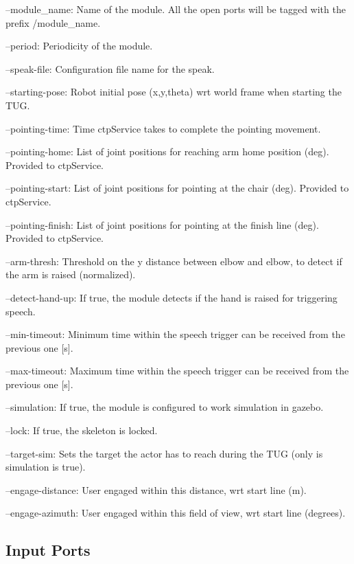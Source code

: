 \begin{DoxyItemize}
\item --module\+\_\+name\+: Name of the module. All the open ports will be tagged with the prefix /module\+\_\+name.
\item --period\+: Periodicity of the module.
\item --speak-\/file\+: Configuration file name for the speak.
\item --starting-\/pose\+: Robot initial pose (x,y,theta) wrt world frame when starting the T\+UG.
\item --pointing-\/time\+: Time ctp\+Service takes to complete the pointing movement.
\item --pointing-\/home\+: List of joint positions for reaching arm home position (deg). Provided to ctp\+Service.
\item --pointing-\/start\+: List of joint positions for pointing at the chair (deg). Provided to ctp\+Service.
\item --pointing-\/finish\+: List of joint positions for pointing at the finish line (deg). Provided to ctp\+Service.
\item --arm-\/thresh\+: Threshold on the y distance between elbow and elbow, to detect if the arm is raised (normalized).
\item --detect-\/hand-\/up\+: If true, the module detects if the hand is raised for triggering speech.
\item --min-\/timeout\+: Minimum time within the speech trigger can be received from the previous one \mbox{[}s\mbox{]}.
\item --max-\/timeout\+: Maximum time within the speech trigger can be received from the previous one \mbox{[}s\mbox{]}.
\item --simulation\+: If true, the module is configured to work simulation in gazebo.
\item --lock\+: If true, the skeleton is locked.
\item --target-\/sim\+: Sets the target the actor has to reach during the T\+UG (only is simulation is true).
\item --engage-\/distance\+: User engaged within this distance, wrt start line (m).
\item --engage-\/azimuth\+: User engaged within this field of view, wrt start line (degrees). 
\end{DoxyItemize}\hypertarget{group__skeletonViewer_inputports_sec}{}\subsection{Input Ports}\label{group__skeletonViewer_inputports_sec}

